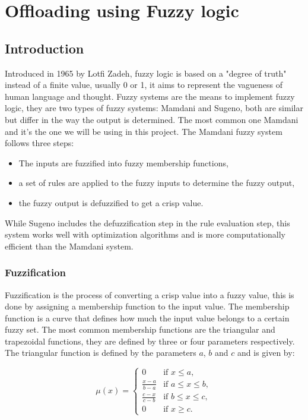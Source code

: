 \chapter{Offloading using Fuzzy logic}
\label{chap:fuzzy}

\section{Introduction}
\label{sec:fuzzy-intro}

Introduced in 1965 by Lotfi Zadeh,\cite{zadeh-1965} fuzzy logic is based on a "degree of truth" instead of a finite
value, usually 0 or 1, it aims to represent the vagueness of human language and thought. Fuzzy systems are the means
to implement fuzzy logic, they are two types of fuzzy systems: Mamdani and Sugeno, both are similar but differ in the
way the output is determined. The most common one Mamdani and it's the one we will be using in this project. The
Mamdani fuzzy system follows three steps:

\begin{itemize}
	\item The inputs are fuzzified into fuzzy membership functions,
	\item a set of rules are applied to the fuzzy inputs to determine the fuzzy output,
	\item the fuzzy output is defuzzified to get a crisp value.
\end{itemize}

While Sugeno includes the defuzzification step in the rule evaluation step, this system works well with optimization
algorithms and is more computationally efficient than the Mamdani system.

\subsection{Fuzzification}
\label{subsec:fuzzy-fuzzification}

Fuzzification is the process of converting a crisp value into a fuzzy value, this is done by assigning a membership
function to the input value. The membership function is a curve that defines how much the input value belongs to a
certain fuzzy set. The most common membership functions are the triangular and trapezoidal functions, they are defined
by three or four parameters respectively. The triangular function is defined by the parameters $a$, $b$ and $c$ and
is given by:

\begin{equation}
	\mu(x) = \begin{cases}
		0                   & \text{if } x \leq a,        \\
		\frac{x - a}{b - a} & \text{if } a \leq x \leq b, \\
		\frac{c - x}{c - b} & \text{if } b \leq x \leq c, \\
		0                   & \text{if } x \geq c.
	\end{cases}
\end{equation}


